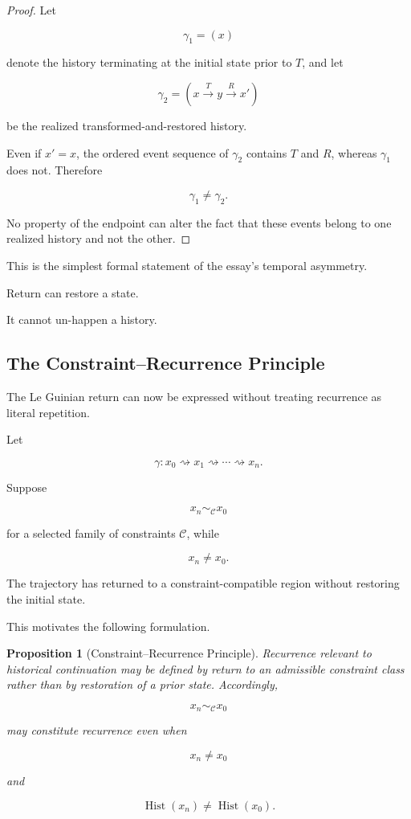 \documentclass[
  11pt,
  a4paper,
  DIV=12,
  BCOR=0mm,
  parskip=half-
]{scrartcl}
\newcommand{\Hist}{\operatorname{Hist}}
\newcommand{\leadsto}{\rightsquigarrow}
\theoremstyle{definition}
\theoremstyle{plain}
\newtheorem{proposition}[definition]{Proposition}
\theoremstyle{remark}
\begin{document}
\begin{proof}
Let

\[
  \gamma_1=(x)
\]

denote the history terminating at the initial state prior to \(T\), and let

\[
  \gamma_2=(x\xrightarrow{T}y\xrightarrow{R}x')
\]

be the realized transformed-and-restored history.

Even if \(x'=x\), the ordered event sequence of \(\gamma_2\) contains \(T\)
and \(R\), whereas \(\gamma_1\) does not. Therefore

\[
  \gamma_1\neq\gamma_2.
\]

No property of the endpoint can alter the fact that these events belong to
one realized history and not the other.
\end{proof}

This is the simplest formal statement of the essay's temporal asymmetry.

Return can restore a state.

It cannot un-happen a history.


\subsection{The Constraint--Recurrence Principle}
\label{sec:constraint-recurrence}

The Le Guinian return can now be expressed without treating recurrence as
literal repetition.

Let

\[
  \gamma:
  x_0
  \leadsto
  x_1
  \leadsto
  \cdots
  \leadsto
  x_n.
\]

Suppose

\[
  x_n\sim_{\mathcal C}x_0
\]

for a selected family of constraints \(\mathcal C\), while

\[
  x_n\neq x_0.
\]

The trajectory has returned to a constraint-compatible region without
restoring the initial state.

This motivates the following formulation.

\begin{proposition}[Constraint--Recurrence Principle]
\label{prop:constraint-recurrence}
Recurrence relevant to historical continuation may be defined by return to an
admissible constraint class rather than by restoration of a prior state.
Accordingly,

\[
  x_n\sim_{\mathcal C}x_0
\]

may constitute recurrence even when

\[
  x_n\neq x_0
\]

and

\[
  \Hist(x_n)\neq\Hist(x_0).
\]
\end{proposition}
\end{document}
